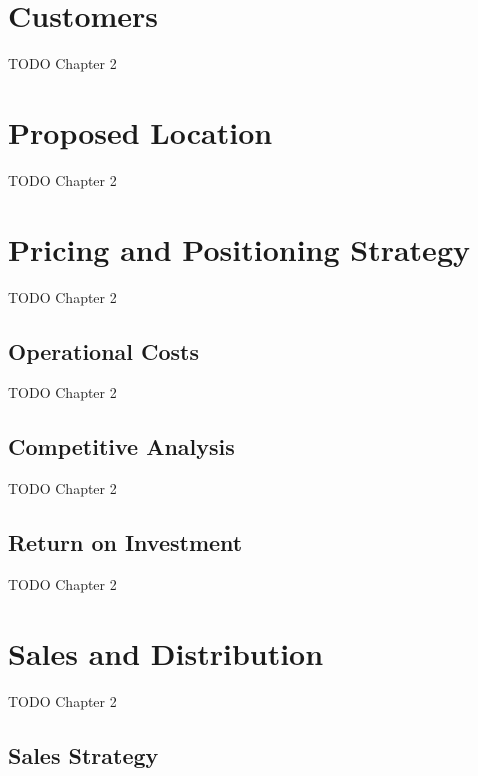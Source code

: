 
\section{Customers}

TODO Chapter 2


\section{Proposed Location}

TODO Chapter 2


\section{Pricing and Positioning Strategy}

TODO Chapter 2

\subsection{Operational Costs}

TODO Chapter 2

\subsection{Competitive Analysis}

TODO Chapter 2

\subsection{Return on Investment}

TODO Chapter 2


\section{Sales and Distribution}

TODO Chapter 2

\subsection{Sales Strategy}

